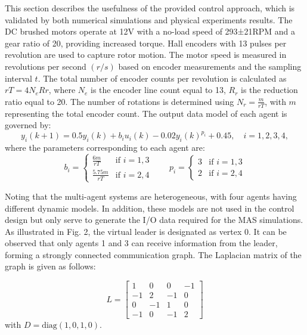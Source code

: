 \documentclass[journal,onecolumn]{IEEEtran}
\begin{document}

This section describes the usefulness of the provided control approach, which is validated by both numerical simulations and physical experiments results. The DC brushed motors operate at 12V with a no-load speed of 293±21RPM and a gear ratio of 20, providing increased torque. Hall encoders with 13 pulses per revolution are used to capture rotor motion. The motor speed is measured in revolutions per second $(r/s)$ based on encoder measurements and the sampling interval $t$. The total number of encoder counts per revolution is calculated as $ rT=4N_{e}R{r} $, where $N_e$ is the encoder line count equal to 13, $R_r$ is the reduction ratio equal to 20. The number of rotations is determined using $N_r = \frac{m}{rT}$, with $m$ representing the total encoder count. The output data model of each agent is governed by:
\[
    y_i(k+1) = 0.5 y_i(k) + b_i u_i(k) - 0.02 y_i(k)^{p_i} + 0.45, \quad i = 1, 2, 3, 4,
\]
where the parameters corresponding to each agent are:
\[
b_i = \begin{cases} 
    \frac{6m}{rT} & \text{if } i=1, 3 \\
    \frac{5.75m}{rT} & \text{if } i=2, 4
\end{cases}
\qquad
p_i = \begin{cases} 
3 & \text{if } i=1, 3 \\
2 & \text{if } i=2, 4
\end{cases}
\]

Noting that the multi-agent systems are heterogeneous, with four agents having different dynamic models. In addition, these models are not used in the control design but only serve to generate the I/O data required for the MAS simulations. As illustrated in Fig. 2, the virtual leader is designated as vertex 0. It can be observed that only agents 1 and 3 can receive information from the leader, forming a strongly connected communication graph. The Laplacian matrix of the graph is given as follows:

\[
    L = \begin{bmatrix}
    1 & 0 & 0 & -1 \\
    -1 & 2 & -1 & 0 \\
    0 & -1 & 1 & 0 \\
    -1 & 0 & -1 & 2
    \end{bmatrix}
\]
with \( D = \text{diag}(1, 0, 1, 0) \).
\end{document}
